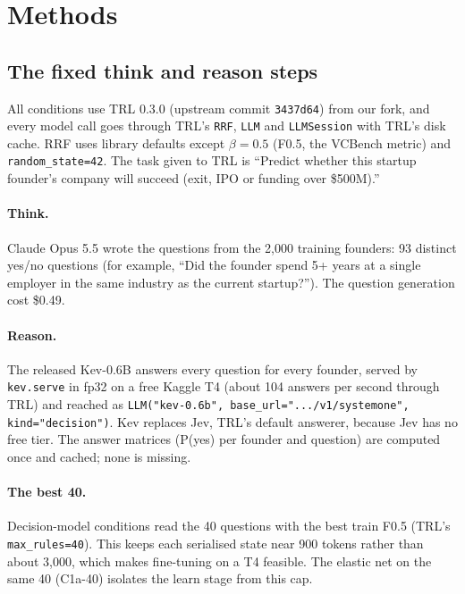 \documentclass{article}
\newcommand{\cond}[1]{#1}
\begin{document}
\section{Methods}
\label{sec:setup}

\subsection{The fixed think and reason steps}

All conditions use TRL 0.3.0 (upstream commit \texttt{3437d64}) from our fork, and every model
call goes through TRL's \texttt{RRF}, \texttt{LLM} and \texttt{LLMSession} with TRL's disk cache.
RRF uses library defaults except $\beta = 0.5$ (F0.5, the VCBench metric) and
\texttt{random\_state=42}. The task given to TRL is ``Predict whether this startup founder's
company will succeed (exit, IPO or funding over \$500M).''

\paragraph{Think.} Claude Opus 5.5 wrote the questions from the 2,000 training founders: 93
distinct yes/no questions (for example, ``Did the founder spend 5+ years at a single employer in
the same industry as the current startup?''). The question generation cost \$0.49.

\paragraph{Reason.} The released Kev-0.6B answers every question for every founder, served by
\texttt{kev.serve} in fp32 on a free Kaggle T4 (about 104 answers per second through TRL) and
reached as \texttt{LLM("kev-0.6b", base\_url=".../v1/systemone", kind="decision")}. Kev replaces
Jev, TRL's default answerer, because Jev has no free tier. The answer matrices (P(yes) per founder
and question) are computed once and cached; none is missing.

\paragraph{The best 40.} Decision-model conditions read the 40 questions with the best train F0.5
(TRL's \texttt{max\_rules=40}). This keeps each serialised state near 900 tokens rather than
about 3,000, which makes fine-tuning on a T4 feasible. The elastic net on the same 40
(\cond{C1a-40}) isolates the learn stage from this cap.
\end{document}
